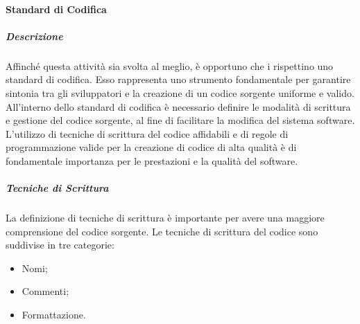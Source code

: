 \paragraph{Standard di Codifica}
\subparagraph{Descrizione}
Affinché questa attività sia svolta al meglio, è opportuno che i \textit{\Progrs} rispettino uno standard di codifica.
Esso rappresenta uno strumento fondamentale per garantire sintonia tra gli sviluppatori e la creazione di un codice sorgente uniforme e valido.
All'interno dello standard di codifica è necessario definire le modalità di scrittura e gestione del codice sorgente, al fine di facilitare la modifica del sistema software.
L'utilizzo di tecniche di scrittura del codice affidabili e di regole di programmazione valide per la creazione di codice di alta qualità è di fondamentale importanza per le prestazioni e la qualità del software.


\subparagraph{Tecniche di Scrittura}
La definizione di tecniche di scrittura è importante per avere una maggiore comprensione del codice sorgente.
Le tecniche di scrittura del codice sono suddivise in tre categorie:
\begin{itemize}
\item
Nomi;
\item
Commenti;
\item
Formattazione.
\end{itemize}

